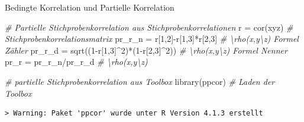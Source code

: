 \documentclass[
  8pt,
  ignorenonframetext,
]{beamer}
\newenvironment{Shaded}{\begin{snugshade}}{\end{snugshade}}
\newcommand{\CommentTok}[1]{\textcolor[rgb]{0.56,0.35,0.01}{\textit{#1}}}
\newcommand{\DecValTok}[1]{\textcolor[rgb]{0.00,0.00,0.81}{#1}}
\newcommand{\FunctionTok}[1]{\textcolor[rgb]{0.00,0.00,0.00}{#1}}
\newcommand{\NormalTok}[1]{#1}
\newcommand{\OtherTok}[1]{\textcolor[rgb]{0.56,0.35,0.01}{#1}}
\newcommand{\SpecialCharTok}[1]{\textcolor[rgb]{0.00,0.00,0.00}{#1}}
\newcommand{\StringTok}[1]{\textcolor[rgb]{0.31,0.60,0.02}{#1}}
\begin{document}
\begin{frame}[fragile]{Bedingte Korrelation und Partielle Korrelation}
\begin{Shaded}
\begin{Highlighting}[]
\CommentTok{\# Partielle Stichprobenkorrelation aus Stichprobenkorrelationen}
\NormalTok{r      }\OtherTok{=} \FunctionTok{cor}\NormalTok{(xyz)                             }\CommentTok{\# Stichprobenkorrelationsmatrix}
\NormalTok{pr\_r\_n }\OtherTok{=}\NormalTok{ r[}\DecValTok{1}\NormalTok{,}\DecValTok{2}\NormalTok{]}\SpecialCharTok{{-}}\NormalTok{r[}\DecValTok{1}\NormalTok{,}\DecValTok{3}\NormalTok{]}\SpecialCharTok{*}\NormalTok{r[}\DecValTok{2}\NormalTok{,}\DecValTok{3}\NormalTok{]                 }\CommentTok{\# \textbackslash{}rho(x,y\textbackslash{}z) Formel Zähler}
\NormalTok{pr\_r\_d }\OtherTok{=} \FunctionTok{sqrt}\NormalTok{((}\DecValTok{1}\SpecialCharTok{{-}}\NormalTok{r[}\DecValTok{1}\NormalTok{,}\DecValTok{3}\NormalTok{]}\SpecialCharTok{\^{}}\DecValTok{2}\NormalTok{)}\SpecialCharTok{*}\NormalTok{(}\DecValTok{1}\SpecialCharTok{{-}}\NormalTok{r[}\DecValTok{2}\NormalTok{,}\DecValTok{3}\NormalTok{]}\SpecialCharTok{\^{}}\DecValTok{2}\NormalTok{))      }\CommentTok{\# \textbackslash{}rho(x,y\textbackslash{}z) Formel Nenner}
\NormalTok{pr\_r   }\OtherTok{=}\NormalTok{ pr\_r\_n}\SpecialCharTok{/}\NormalTok{pr\_r\_d                        }\CommentTok{\# \textbackslash{}rho(x,y\textbackslash{}z)          }

\CommentTok{\# partielle Stichprobenkorrelation aus Toolbox}
\FunctionTok{library}\NormalTok{(ppcor)                                }\CommentTok{\# Laden der Toolbox}
\end{Highlighting}
\end{Shaded}

\begin{verbatim}
> Warning: Paket 'ppcor' wurde unter R Version 4.1.3 erstellt
\end{verbatim}

\begin{Shaded}
\end{Shaded}


\end{frame}
\end{document}
